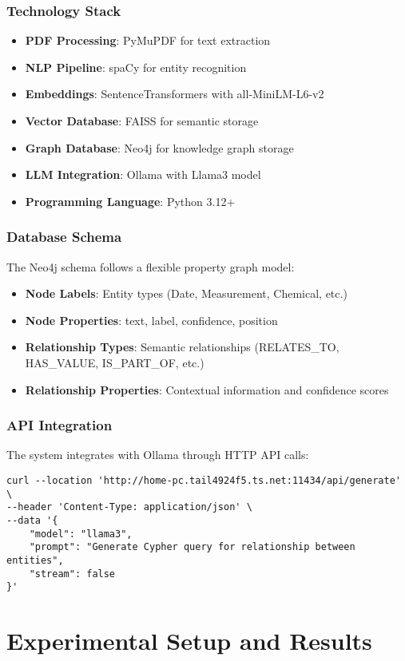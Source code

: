 \documentclass[conference]{IEEEtran}
\begin{document}
\subsubsection{Technology Stack}
\begin{itemize}
\item \textbf{PDF Processing}: PyMuPDF for text extraction
\item \textbf{NLP Pipeline}: spaCy for entity recognition
\item \textbf{Embeddings}: SentenceTransformers with all-MiniLM-L6-v2
\item \textbf{Vector Database}: FAISS for semantic storage
\item \textbf{Graph Database}: Neo4j for knowledge graph storage
\item \textbf{LLM Integration}: Ollama with Llama3 model
\item \textbf{Programming Language}: Python 3.12+
\end{itemize}

\subsubsection{Database Schema}
The Neo4j schema follows a flexible property graph model:
\begin{itemize}
\item \textbf{Node Labels}: Entity types (Date, Measurement, Chemical, etc.)
\item \textbf{Node Properties}: text, label, confidence, position
\item \textbf{Relationship Types}: Semantic relationships (RELATES\_TO, HAS\_VALUE, IS\_PART\_OF, etc.)
\item \textbf{Relationship Properties}: Contextual information and confidence scores
\end{itemize}

\subsubsection{API Integration}
The system integrates with Ollama through HTTP API calls:
\begin{verbatim}
curl --location 'http://home-pc.tail4924f5.ts.net:11434/api/generate' \
--header 'Content-Type: application/json' \
--data '{
    "model": "llama3",
    "prompt": "Generate Cypher query for relationship between entities",
    "stream": false
}'
\end{verbatim}

\section{Experimental Setup and Results}
\end{document}
